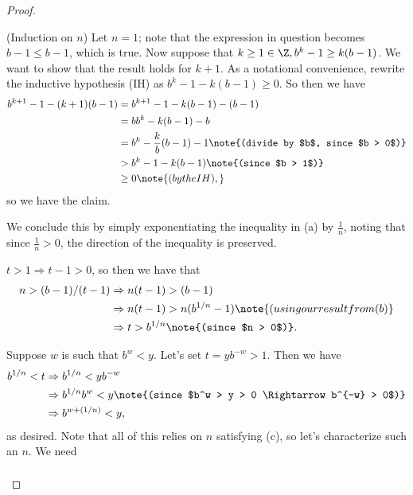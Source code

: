 \documentclass{assignment}
\begin{document}
\begin{proof}
  \begin{qparts}
  \item (Induction on $n$) Let $n = 1$; note that the expression in question becomes $b - 1 \leq b -
    1$, which is true. Now suppose that $k \geq 1\in\Z, b^k - 1 \geq k(b - 1)$. We want to show that
    the result holds for $k + 1$. As a notational convenience, rewrite the inductive hypothesis
    (IH) as $b^k -1 - k(b - 1) \geq 0$. So then we have 
    \begin{align*}
      b^{k+1} - 1 - (k + 1)(b - 1) &= b^{k+1} - 1 - k(b - 1) - (b - 1) \\
                                   &= bb^{k} - k(b-1) - b \\
                                   &= b^k -\frac{k}{b}(b - 1) -1 \note{(divide by $b$, since $b > 0$)} \\
                                   &> b^k -1 -k(b - 1) \note{(since $b > 1$)} \\
                                   &\geq 0 \note{(by the IH),}
    \end{align*}
    so we have the claim.
  \item We conclude this by simply exponentiating the inequality in (a) by $\frac{1}{n}$, noting that
    since $\frac{1}{n} > 0$, the direction of the inequality is preserved.
  \item $t > 1 \Rightarrow t -1 > 0$, so then we have that 
    \begin{align*}
      n > (b-1)/(t-1) &\Rightarrow n(t - 1) > (b - 1) \\
                      &\Rightarrow n(t-1) > n(b^{1/n} - 1) \note{(using our result from (b)} \\
                      &\Rightarrow t > b^{1/n} \note{(since $n > 0$)}.
    \end{align*}
  \item Suppose $w$ is such that $b^w < y$. Let's set $t = yb^{-w} > 1$. Then we have 
    \begin{align*}
      b^{1/n} < t &\Rightarrow b^{1/n} < yb^{-w} \\
                  &\Rightarrow b^{1/n}b^w < y \note{(since $b^w > y > 0 \Rightarrow b^{-w} > 0$)} \\
                  &\Rightarrow b^{w + (1/n)} < y,
    \end{align*}
    as desired. Note that all of this relies on $n$ satisfying (c), so let's characterize such an $n$.
    We need 
    \begin{align*}

\end{align*}
\end{qparts}
\end{proof}
\end{document}
